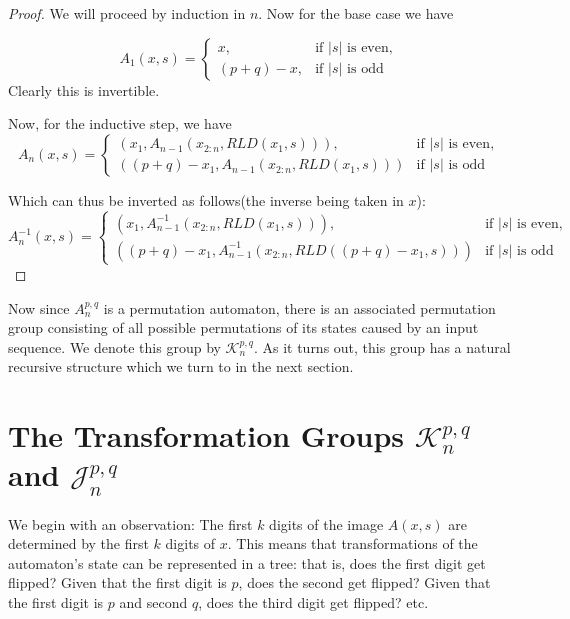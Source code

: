 \documentclass[11pt]{article}
\theoremstyle{plain}
\theoremstyle{definition}
\begin{document}
\begin{proof}
We will proceed by induction in $n$. Now for the base case we have

\[
A_1(x, s) = 
\begin{cases}
x, &  \text{if $|s|$ is even}, \\

(p+q) - x, & \text{if  $|s|$  is odd}
\end{cases}
\]
Clearly this is invertible.

Now, for the inductive step, we have 
\[
A_n(x, s) = 
\begin{cases}
(x_1,  A_{n-1}(x_{2:n}, RLD(x_1, s))),  &  \text{if $|s|$ is even}, \\

((p+q) - x_1,  A_{n-1}(x_{2:n}, RLD(x_1, s))) & \text{if  $|s|$  is odd}
\end{cases}
\]

Which can thus be inverted as follows(the inverse being taken in $x$):
\[
A_n^{-1}(x, s) = 
\begin{cases}
(x_1,  A_{n-1}^{-1}(x_{2:n}, RLD(x_1, s))),  &  \text{if $|s|$ is even}, \\

((p+q) - x_1,  A_{n-1}^{-1}(x_{2:n}, RLD((p + q) - x_1, s))) & \text{if  $|s|$  is odd}
\end{cases}
\]

\end{proof}


Now since $A_n^{p,q}$ is a permutation automaton, there is an associated permutation group consisting of all possible permutations of its states caused by an input sequence. We denote this group by $\mathcal{K}_n^{p,q}$. As it turns out, this group has a natural recursive structure which we turn to in the next section.


\section{The Transformation Groups $\mathcal{K}_n^{p,q}$ and $\mathcal{J}_n^{p,q}$}


We begin with an observation: The first $k$ digits of the image $A(x, s)$ are determined by the first $k$ digits of $x$. This means that transformations of the automaton's state can be represented in a tree: that is, does the first digit get flipped? Given that the first digit is $p$, does the second get flipped? Given that the first digit is $p$ and second $q$, does the third digit get flipped? etc.
\end{document}
